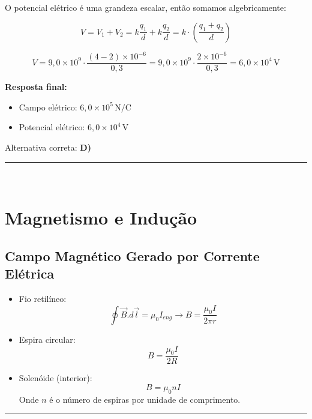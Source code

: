 \documentclass[a4paper,12pt]{article}
\begin{document}
\begin{flushleft}
O potencial elétrico é uma grandeza escalar, então somamos algebricamente:

\[
V = V_1 + V_2
= k \frac{q_1}{d} + k \frac{q_2}{d}
= k \cdot \left( \frac{q_1 + q_2}{d} \right)
\]

\[
V = 9{,}0 \times 10^9 \cdot \frac{(4 - 2) \times 10^{-6}}{0{,}3}
= 9{,}0 \times 10^9 \cdot \frac{2 \times 10^{-6}}{0{,}3}
= 6{,}0 \times 10^4\,\text{V}
\]

\vspace{0.5cm}
\textbf{Resposta final:}

\begin{itemize}
    \item \colorbox{green!20}{Campo elétrico: \( \boxed{6{,}0 \times 10^5\,\text{N/C}} \)}
    \item \colorbox{blue!20}{Potencial elétrico: \( \boxed{6{,}0 \times 10^4\,\text{V}} \)}
\end{itemize}

Alternativa correta: \colorbox{green!50}{\textbf{D)}}

\end{flushleft}

\noindent\rule{\linewidth}{0.6pt}\\

\section{Magnetismo e Indução}

\subsection{Campo Magnético Gerado por Corrente Elétrica}
\begin{itemize}
    \item Fio retilíneo:
    \[
        \oint \vec{B}.d\vec{l} = \mu_{0}I_{eng} \rightarrow B = \frac{\mu_0 I}{2\pi r}
    \]
    \item Espira circular:
    \[
        B = \frac{\mu_0 I}{2R}
    \]
    \item Solenóide (interior):
    \[
        B = \mu_0 n I
    \]
    Onde $n$ é o número de espiras por unidade de comprimento.
\end{itemize}

\noindent\rule{\linewidth}{0.6pt}\\
\end{document}
